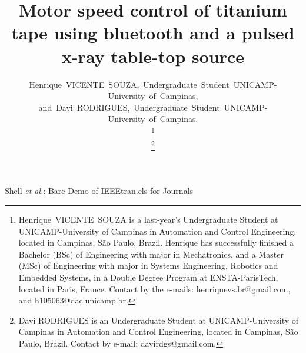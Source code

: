 \documentclass[journal]{IEEEtran}
\begin{document}
\title{Motor speed control of titanium tape using bluetooth and a pulsed x-ray table-top source}


\author{Henrique~VICENTE~SOUZA,~Undergraduate~Student~UNICAMP-University~of~Campinas,\\
        and~Davi~RODRIGUES,~Undergraduate~Student~UNICAMP-University~of~Campinas.%
        
\thanks{Henrique~VICENTE~SOUZA is a last-year's Undergraduate Student at UNICAMP-University of Campinas in Automation and Control Engineering, located in Campinas, S\~{a}o Paulo, Brazil. Henrique has successfully finished a Bachelor (BSc) of Engineering with major in Mechatronics, and a Master (MSc) of Engineering with major in Systems Engineering, Robotics and Embedded Systems, in a Double Degree Program at ENSTA-ParisTech, located in Paris, France. Contact by the e-mails: henriquevs.br@gmail.com, and h105063@dac.unicamp.br.}%

\thanks{Davi RODRIGUES is an Undergraduate Student at UNICAMP-University of Campinas in Automation and Control Engineering, located in Campinas, S\~{a}o Paulo, Brazil. Contact by e-mail: davirdgs@gmail.com.}%

}


%
{Shell \MakeLowercase{\textit{et al.}}: Bare Demo of IEEEtran.cls for Journals}



\maketitle
\end{document}
